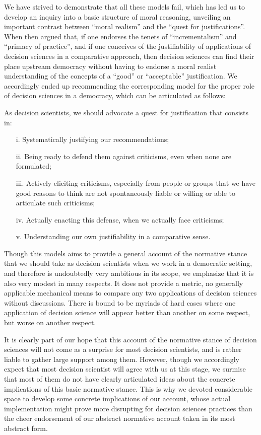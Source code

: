 \documentclass[preprint, french, english, 11pt]{elsarticle}%
\begin{document}
We have strived to demonstrate that all these models fail, which has led us to develop an inquiry into a basic structure of moral reasoning, unveiling an important contrast between ``moral realism'' and the ``quest for justifications''. When then argued that, if one endorses the tenets of ``incrementalism'' and ``primacy of practice'', and if one conceives of the justifiability of applications of decision sciences in a comparative approach, then decision sciences can find their place upstream democracy without having to endorse a moral realist understanding of the concepts of a ``good'' or ``acceptable'' justification. We accordingly ended up recommending the corresponding model for the proper role of decision sciences in a democracy, which can be articulated as follows:

As decision scientists, we should advocate a quest for justification that consists in:
\begin{itemize}
\item[i.]	Systematically justifying our recommendations;
\item[ii.]	Being ready to defend them against criticisms, even when none are formulated;
\item[iii.]	Actively eliciting criticisms, especially from people or groups that we have good reasons to think are not spontaneously liable or willing or able to articulate such criticisms;
\item[iv.]	Actually enacting this defense, when we actually face criticisms;
\item[v.]	Understanding our own justifiability in a comparative sense.
\end{itemize}

Though this models aims to provide a general account of the normative stance that we should take as decision scientists when we work in a democratic setting, and therefore is undoubtedly very ambitious in its scope, we emphasize that it is also very modest in many respects. It does not provide a metric, no generally applicable mechanical means to compare any two applications of decision sciences without discussions. There is bound to be myriads of hard cases where one application of decision science will appear better than another on some respect, but worse on another respect.

It is clearly part of our hope that this account of the normative stance of decision sciences will not come as a surprise for most decision scientists, and is rather liable to gather large support among them. However, though we accordingly expect that most decision scientist will agree with us at this stage, we surmise that most of them do not have clearly articulated ideas about the concrete implications of this basic normative stance. This is why we devoted considerable space to develop some concrete implications of our account, whose actual implementation might prove more disrupting for decision sciences practices than the cheer endorsement of our abstract normative account taken in its most abstract form.
 
\end{document}

